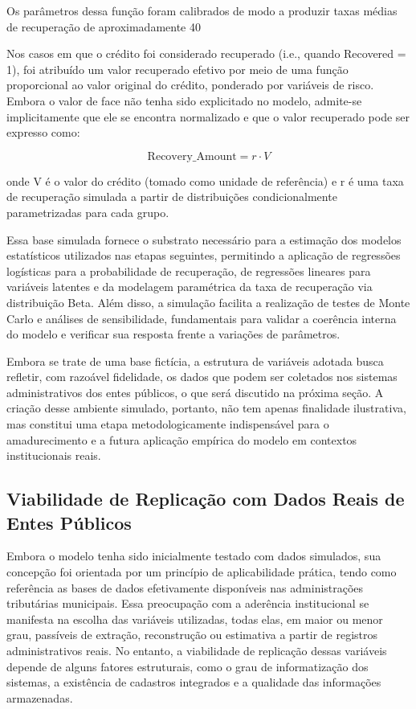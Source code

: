 \documentclass[a4paper,12pt]{article}
\begin{document}
Os parâmetros dessa função foram calibrados de modo a produzir taxas médias de recuperação de aproximadamente 40%

Nos casos em que o crédito foi considerado recuperado (i.e., quando Recovered = 1), foi atribuído um valor recuperado efetivo por meio de uma função proporcional ao valor original do crédito, ponderado por variáveis de risco. Embora o valor de face não tenha sido explicitado no modelo, admite-se implicitamente que ele se encontra normalizado e que o valor recuperado pode ser expresso como:

\[
\text{Recovery\_Amount} = r \cdot V
\]

onde V é o valor do crédito (tomado como unidade de referência) e r é uma taxa de recuperação simulada a partir de distribuições condicionalmente parametrizadas para cada grupo.

Essa base simulada fornece o substrato necessário para a estimação dos modelos estatísticos utilizados nas etapas seguintes, permitindo a aplicação de regressões logísticas para a probabilidade de recuperação, de regressões lineares para variáveis latentes e da modelagem paramétrica da taxa de recuperação via distribuição Beta. Além disso, a simulação facilita a realização de testes de Monte Carlo e análises de sensibilidade, fundamentais para validar a coerência interna do modelo e verificar sua resposta frente a variações de parâmetros.

Embora se trate de uma base fictícia, a estrutura de variáveis adotada busca refletir, com razoável fidelidade, os dados que podem ser coletados nos sistemas administrativos dos entes públicos, o que será discutido na próxima seção. A criação desse ambiente simulado, portanto, não tem apenas finalidade ilustrativa, mas constitui uma etapa metodologicamente indispensável para o amadurecimento e a futura aplicação empírica do modelo em contextos institucionais reais.

\subsection{Viabilidade de Replicação com Dados Reais de Entes Públicos}
Embora o modelo tenha sido inicialmente testado com dados simulados, sua concepção foi orientada por um princípio de aplicabilidade prática, tendo como referência as bases de dados efetivamente disponíveis nas administrações tributárias municipais. Essa preocupação com a aderência institucional se manifesta na escolha das variáveis utilizadas, todas elas, em maior ou menor grau, passíveis de extração, reconstrução ou estimativa a partir de registros administrativos reais. No entanto, a viabilidade de replicação dessas variáveis depende de alguns fatores estruturais, como o grau de informatização dos sistemas, a existência de cadastros integrados e a qualidade das informações armazenadas.
\end{document}

